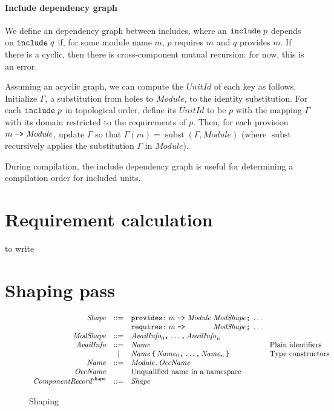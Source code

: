 \documentclass{article}
\newcommand{\I}[1]{\ensuremath{\mathit{#1}}}
\newcommand{\Red}[1]{{\color{red} #1}}
\begin{document}
\paragraph{Include dependency graph}  We define an dependency graph
between includes, where an $\verb|include|\; p$ depends on
$\verb|include|\; q$ if, for some module name $m$, $p$ requires $m$ and
$q$ provides $m$.  If there is a cyclic, then there is cross-component
mutual recursion: for now, this is an error.

Assuming an acyclic graph, we can compute the \I{UnitId} of each
key as follows.  Initialize $\Gamma$, a substitution from holes to \I{Module},
to the identity substitution. For each $\verb|include|\; p$ in topological
order, define its \I{UnitId} to be $p$ with the mapping $\Gamma$ with its
domain restricted to the requirements of $p$.  Then, for each provision
$m\; \verb|->|\; \I{Module}$, update $\Gamma$ so that
$\Gamma(m) = \operatorname{subst} (\Gamma, \I{Module})$
(where $\operatorname{subst}$ recursively applies the substitution $\Gamma$ in \I{Module}).

During compilation, the include dependency graph is useful for
determining a compilation order for included units.

\newpage
\section{Requirement calculation}

\Red{to write}

\newpage
\section{Shaping pass}

\begin{figure}[htpb]
$$
\begin{array}{rcll}
\I{Shape} & ::= & \verb|provides:|\; m \; \verb|->|\; \I{Module}\; \I{ModShape} \verb|;|\; \ldots \\
      &     & \verb|requires:| \; m \; \verb|->|\; \textcolor{white}{\I{Module}}\; \I{ModShape}  \verb|;|\; \ldots \\
\I{ModShape} & ::= & \I{AvailInfo}_0 \verb|,|\, \ldots \verb|,|\, \I{AvailInfo}_n \\
\I{AvailInfo} & ::= & \I{Name} & \mbox{Plain identifiers} \\
          & |   & \I{Name} \, \verb|{| \, \I{Name}_0\verb|,| \, \ldots\verb|,| \, \I{Name}_n \, \verb|}| & \mbox{Type constructors} \\
\I{Name}   & ::= & \I{Module} \verb|.| \I{OccName} \\
\I{OccName} & & \mbox{Unqualified name in a namespace} \\
\I{ComponentRecord}^{\mathsf{shape}} & ::= & \I{Shape}
\end{array}
$$
\caption{Shaping} \label{fig:shaping}
\end{figure}
\end{document}
